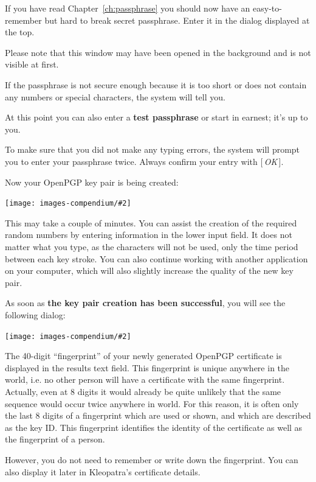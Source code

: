 \documentclass[a4paper,11pt,oneside,openright,titlepage]{scrbook}
\newcommand{\Button}[1]{[\,\textit{#1}\,]}
\newcommand{\IncludeImage}[2][]{
\begin{center}
  \texttt{[image: images-compendium/\#2]}%
\end{center}
}
\begin{document}
If you have read Chapter~\ref{ch:passphrase} you should now have an
easy-to-remember but hard to break secret passphrase. Enter it in the
dialog displayed at the top.

Please note that this window may have been opened in the background
and is not visible at first.

If the passphrase is not secure enough because it is too short or does
not contain any numbers or special characters, the system will tell
you.

At this point you can also enter a \textbf{test passphrase} or start
in earnest; it's up to you.

To make sure that you did not make any typing errors, the system will
prompt you to enter your passphrase twice.  Always confirm your entry
with \Button{OK}.

\clearpage
Now your OpenPGP key pair is being created:

\IncludeImage[width=0.85\textwidth]{sc-kleopatra-openpgp-createKey_en}

This may take a couple of minutes. You can assist the creation of the
required random numbers by entering information in the lower input
field.  It does not matter what you type, as the characters will
not be used, only the time period between each key stroke. You can also
continue working with another application on your computer, which will
also slightly increase the quality of the new key pair.

\clearpage
As soon as \textbf{the key pair creation has been successful}, you
will see the following dialog:

\IncludeImage[width=0.85\textwidth]{sc-kleopatra-openpgp-keyPairCreated_en}

The 40-digit ``fingerprint'' of your newly
generated OpenPGP certificate is displayed in the results text field.
This fingerprint is unique anywhere in the world, i.e. no other person
will have a certificate with the same fingerprint. Actually, even at
8 digits it would already be quite unlikely that the same sequence would
occur twice anywhere in world.  For this reason, it is often only the
last 8 digits of a
fingerprint which are used or shown, and which are described as the
key ID. This fingerprint
identifies the identity of the certificate as well as the fingerprint
of a person.

However, you do not need to remember or write down the fingerprint.
You can also display it later in Kleopatra's certificate details.
\end{document}
